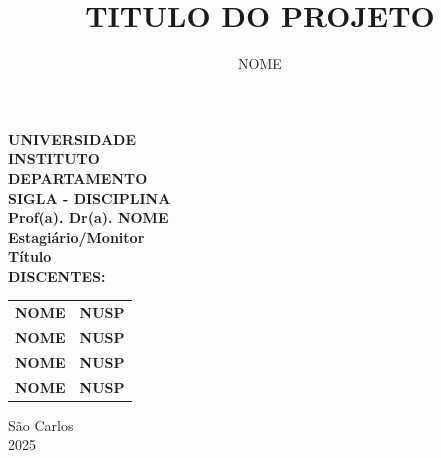\documentclass[
article,
hidelinks,
12pt,
openright,
twoside,
a4paper,
sumario = tradicional,
brazil
]{abntex2}
\title{TITULO DO PROJETO}%
\author{NOME}%
\begin{document}
\pagestyle{empty}
\begin{center}
\textbf{UNIVERSIDADE}\\
\textbf{INSTITUTO}\\
\textbf{DEPARTAMENTO}\\
\vspace{1.5cm}
\textbf{SIGLA - DISCIPLINA\\Prof(a). Dr(a). NOME}\\
\textbf{Estagiário/Monitor}\\
\vspace{3.5cm}
{\fontsize{18pt}{22.5pt}\selectfont \textbf{
Título}}\\

\vspace{3.5cm}
\noindent\textbf{DISCENTES:}

\vspace{1cm}

\hspace*{5.8cm} %
\begin{tabular}{@{}l l@{}}
\textbf{NOME} & \textbf{NUSP} \\
\textbf{NOME} & \textbf{NUSP} \\
\textbf{NOME} & \textbf{NUSP} \\
\textbf{NOME} & \textbf{NUSP} \\
\end{tabular}
\vfill
\begin{center}
{São Carlos\\2025}  
\end{center}
\end{center}

\newpage
\cleardoublepage
\end{document}
